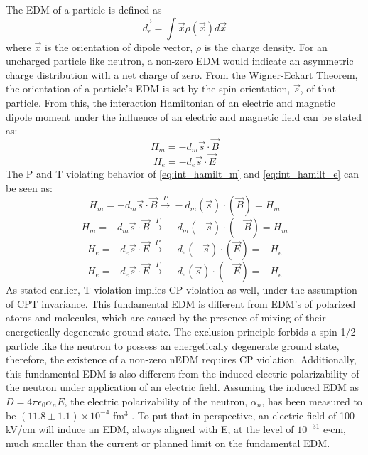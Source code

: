 The EDM of a particle is defined as 
\begin{equation} \label{eq:dipole}
\vec{d_e}=\int \Vec{x} \rho(\Vec{x})  d\Vec{x}
\end{equation}
where $\Vec{x}$ is the orientation of dipole vector, $\rho$ is the charge density. For an uncharged particle like neutron, a non-zero EDM would indicate an asymmetric charge distribution with a net charge of zero. From the Wigner-Eckart Theorem, the orientation of a particle's EDM is set by the spin orientation, $\Vec{s}$, of that particle. From this, the interaction Hamiltonian of an electric and magnetic dipole moment under the influence of an electric and magnetic field can be stated as:
\begin{equation} \label{eq:int_hamilt_m}
    H_m = -d_m \Vec{s} \cdot \vec{B}
\end{equation}    
\begin{equation} \label{eq:int_hamilt_e}
    H_e = -d_e \Vec{s} \cdot \vec{E}
\end{equation}
The P and T violating behavior of \cref{eq:int_hamilt_m} and \cref{eq:int_hamilt_e} can be seen as:
\begin{equation}
    H_m = -d_m \Vec{s} \cdot \vec{B} \xrightarrow[]{P} -d_m( \Vec{s} ) \cdot ( \vec{B} ) = H_m
\end{equation}
\begin{equation}
    H_m = -d_m \Vec{s} \cdot \vec{B} \xrightarrow[]{T} -d_m( -\Vec{s} ) \cdot ( -\vec{B} ) = H_m
\end{equation}
\begin{equation}
    H_e = -d_e \Vec{s} \cdot \vec{E} \xrightarrow[]{P} -d_e( -\Vec{s} ) \cdot ( \vec{E} ) = -H_e 
\end{equation}
\begin{equation}    
    H_e = -d_e \Vec{s} \cdot \vec{E} \xrightarrow[]{T} -d_e( \Vec{s} ) \cdot ( -\vec{E} ) = -H_e
\end{equation}
As stated earlier, T violation implies CP violation as well, under the assumption of CPT invariance. This fundamental EDM is different from EDM's of polarized atoms and molecules, which are caused by the presence of mixing of their energetically degenerate ground state. The exclusion principle forbids a spin-1/2 particle like the neutron to possess an energetically degenerate ground state, therefore, the existence of a non-zero nEDM requires CP violation. Additionally, this fundamental EDM is also different from the induced electric polarizability of the neutron under application of an electric field. Assuming the induced EDM as $D = 4\pi \epsilon_0 \alpha_n E$, the electric polarizability of the neutron, $\alpha_n$, has been measured to be $(11.8 \pm 1.1) \times 10^{-4}$ fm$^{3}$ \cite{PDG2022, Myers2014}. To put that in perspective, an electric field of 100 kV/cm will induce an EDM, always aligned with E, at the level of $10^{-31}$ e$\cdot$cm, much smaller than the current or planned limit on the fundamental EDM.

